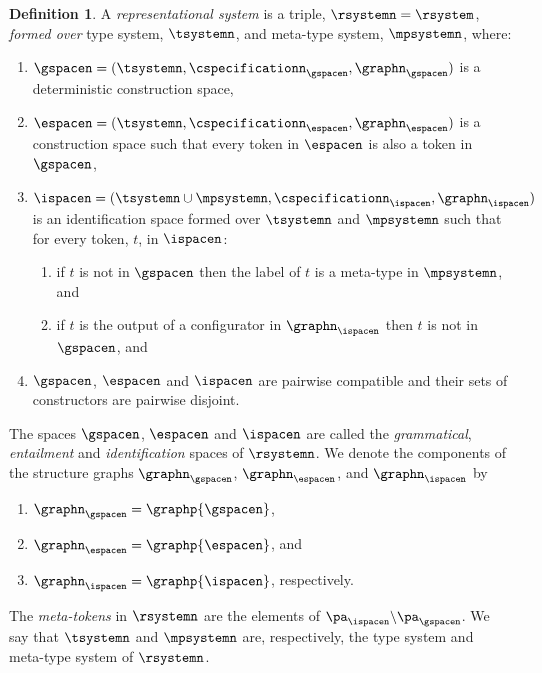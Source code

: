 \documentclass[a4paper]{article}
\theoremstyle{definition}
\newtheorem{definition}{Definition}
\begin{document}
	\begin{definition}\label{defn:representationalSystem}
		A \textit{representational system} is a triple, $\rsystemn= \rsystem$, \textit{formed over} type system, $\tsystemn$, and meta-type system, $\mpsystemn$, where:
		\begin{enumerate}[itemsep=0pt,topsep=4pt]
			\item $\gspacen=(\tsystemn,\cspecificationn_{\gspacen},\graphn_{\gspacen})$ is a deterministic construction space,
			\item $\espacen=(\tsystemn, \cspecificationn_{\espacen},\graphn_{\espacen})$ is a construction space such that every token in $\espacen$ is also a token in $\gspacen$,
			\item $\ispacen=(\tsystemn\cup \mpsystemn, \cspecificationn_{\ispacen},\graphn_{\ispacen})$ is an identification space formed over $\tsystemn$ and $\mpsystemn$ %
			such that for every token, $t$, in $\ispacen$:
			\begin{enumerate}[itemsep=0pt,topsep=2pt]
				\item if $t$ is not in $\gspacen$ then the label of $t$ is a meta-type in $\mpsystemn$, and
				\item if $t$ is the output of a configurator in $\graphn_{\ispacen}$ then $t$ is not in $\gspacen$, and
			\end{enumerate}
			\item $\gspacen$, $\espacen$ and $\ispacen$ are pairwise compatible and their sets of constructors are pairwise disjoint.
		\end{enumerate}
		The spaces $\gspacen$, $\espacen$ and $\ispacen$ are called the \textit{grammatical}, \textit{entailment} and \textit{identification} spaces of $\rsystemn$. We denote the components of the structure graphs $\graphn_\gspacen$, $\graphn_\espacen$, and $\graphn_\ispacen$ by
		\begin{enumerate}[itemsep=0pt,topsep=4pt]
			\item $\graphn_{\gspacen}=\graphp{\gspacen}$,
			\item $\graphn_{\espacen}=\graphp{\espacen}$, and
			\item $\graphn_{\ispacen}=\graphp{\ispacen}$, respectively.
		\end{enumerate}
		The \textit{meta-tokens} in $\rsystemn$ are the elements of $\pa_{\ispacen}\backslash \pa_{\gspacen}$.
		We say that $\tsystemn$ and $\mpsystemn$ are, respectively, the type system and meta-type system of $\rsystemn$.
	\end{definition}
\end{document}
